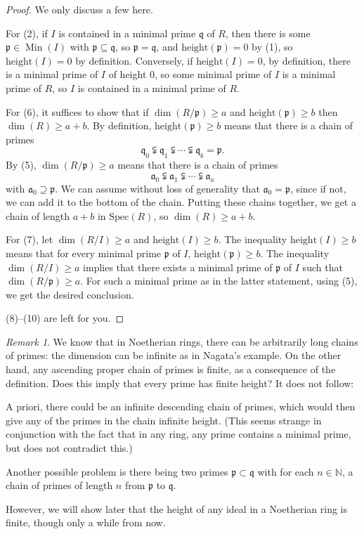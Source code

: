 \documentclass{amsart}[12pt]
\def\Min{\operatorname{Min}}
\newcommand{\N}{\mathbb{N}}
\newcommand{\p}{{\mathfrak p}}
\newcommand{\q}{{\mathfrak q}}
\numberwithin{equation}{section}
\theoremstyle{plain} %
\theoremstyle{definition}
\theoremstyle{remark}
\newtheorem{rem}[equation]{Remark}
\newcommand{\Spec}{\mathrm{Spec}}
\begin{document}
\begin{proof}
We only discuss a few here.

For (2), if $I$ is contained in a minimal prime $\q$ of $R$, then there is some $\p\in \Min(I)$ with $\p\subseteq \q$, so $\p=\q$, and $\mathrm{height}(\p)=0$ by (1), so $\mathrm{height}(I)=0$ by definition. Conversely, if $\mathrm{height}(I)=0$, by definition, there is a minimal prime of $I$ of height $0$, so some minimal prime of $I$ is a minimal prime of $R$, so $I$ is contained in a minimal prime of $R$.

For (6), it suffices to show that if $\dim(R/\p)\geq a$ and $\mathrm{height}(\p) \geq b$ then $\dim(R) \geq a+b$. By definition, $\mathrm{height}(\p) \geq b$ means that there is a chain of primes 
\[ \q_0 \subsetneqq \q_1 \subsetneqq \cdots \subsetneqq \q_b = \p.\] By (5), $\dim(R/\p)\geq a$ means that there is a chain of primes 
\[ \mathfrak{a}_0 \subsetneqq \mathfrak{a}_1 \subsetneqq \cdots \subsetneqq \mathfrak{a}_a\]
with $\mathfrak{a}_0 \supseteq \p$. We can assume without loss of generality that $\mathfrak{a}_0=\p$, since if not, we can add it to the bottom of the chain. Putting these chains together, we get a chain of length $a+b$ in $\Spec(R)$, so $\dim(R) \geq a+b$.

For (7), let $\dim(R/I)\geq a$ and $\mathrm{height}(I) \geq b$. The inequality $\mathrm{height}(I) \geq b$ means that for every minimal prime $\p$ of $I$, $\mathrm{height}(\p) \geq b$. The inequality $\dim(R/I) \geq a$ implies that there exists a minimal prime of $\p$ of $I$ such that $\dim(R/\p) \geq a$. For such a minimal prime as in the latter statement, using (5), we get the desired conclusion.

(8)--(10) are left for you.
\end{proof}


\begin{rem} We know that in Noetherian rings, there can be arbitrarily long chains of primes: the dimension can be infinite as in Nagata's example. On the other hand, any ascending proper chain of primes is finite, as a consequence of the definition. Does this imply that every prime has finite height? It does not follow: 

A priori, there could be an infinite descending chain of primes, which would then give any of the primes in the chain infinite height. (This seems strange in conjunction with the fact that in any ring, any prime contains a minimal prime, but does not contradict this.) 

Another possible problem is there being two primes $\p \subset \q$ with for each $n\in \N$, a chain of primes of length $n$ from $\p$ to $\q$.

However, we will show later that the height of any ideal in a Noetherian ring is finite, though only a while from now.
\end{rem}
\end{document}
